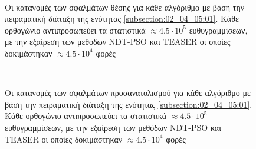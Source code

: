 \begin{figure}[!h]\centering
  \begin{subfigure}{\linewidth}
    \vspace{2cm}
    
    \vspace{1cm}
  \end{subfigure}\\%
  \begin{subfigure}{\linewidth}
    \vspace{1cm}
    
    \vspace{1cm}
  \end{subfigure}%
\caption{\small Οι κατανομές των σφαλμάτων θέσης για κάθε αλγόριθμο με βάση
         την πειραματική διάταξη της ενότητας \ref{subsection:02_04_05:01}.
         Κάθε ορθογώνιο αντιπροσωπεύει τα στατιστικά $\approx 4.5\cdot10^5$
         ευθυγραμμίσεων, με την εξαίρεση των μεθόδων NDT-PSO και TEASER οι
         οποίες δοκιμάστηκαν $\approx 4.5 \cdot 10^4$ φορές}
\label{fig:appendix:02_04_05:01}
\end{figure}

\begin{figure}[!h]\centering
  \begin{subfigure}{\linewidth}
    \vspace{1cm}
    
    \vspace{1cm}
  \end{subfigure}\\%
  \begin{subfigure}{\linewidth}
    \vspace{1cm}
    
    \vspace{1cm}
  \end{subfigure}%
\caption{\small Οι κατανομές των σφαλμάτων προσανατολισμού για κάθε αλγόριθμο με
         βάση την πειραματική διάταξη της ενότητας
         \ref{subsection:02_04_05:01}.  Κάθε ορθογώνιο αντιπροσωπεύει τα
         στατιστικά $\approx 4.5\cdot10^5$ ευθυγραμμίσεων, με την εξαίρεση των
         μεθόδων NDT-PSO και TEASER οι οποίες δοκιμάστηκαν $\approx 4.5 \cdot
         10^4$ φορές}
\label{fig:appendix:02_04_05:02}
\end{figure}
